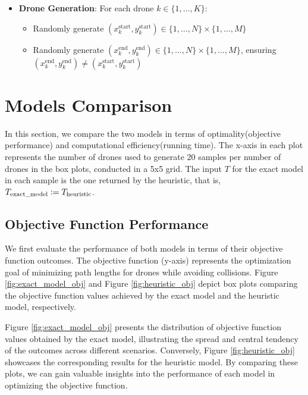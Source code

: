 \begin{itemize}
\item \textbf{Drone Generation}: For each drone $k \in \{1, \ldots, K\}$:
  \begin{itemize}
  \item Randomly generate $(x_k^{\text{start}}, y_k^{\text{start}}) \in \{1, \ldots, N\} \times \{1, \ldots, M\}$
  \item Randomly generate $(x_k^{\text{end}}, y_k^{\text{end}}) \in \{1, \ldots, N\} \times \{1, \ldots, M\}$, ensuring $(x_k^{\text{end}}, y_k^{\text{end}}) \neq (x_k^{\text{start}}, y_k^{\text{start}})$
  \end{itemize}
\end{itemize}

\section{Models Comparison}
\label{sec:comparison}

In this section, we compare the two models in terms of optimality(objective performance) and computational efficiency(running time). The x-axis in each plot represents the number of drones used to generate 20 samples per number of drones in the box plots, conducted in a 5x5 grid. The input $T$ for the exact model in each sample is the one returned by the heuristic, that is, $ T_{\text{exact\_model}} \vcentcolon  = T_{\text{heuristic}}$.

\subsection{Objective Function Performance}

We first evaluate the performance of both models in terms of their objective function outcomes. The objective function (y-axis) represents the optimization goal of minimizing path lengths for drones while avoiding collisions. Figure \ref{fig:exact_model_obj} and Figure \ref{fig:heuristic_obj} depict box plots comparing the objective function values achieved by the exact model and the heuristic model, respectively. 

Figure \ref{fig:exact_model_obj} presents the distribution of objective function values obtained by the exact model, illustrating the spread and central tendency of the outcomes across different scenarios. Conversely, Figure \ref{fig:heuristic_obj} showcases the corresponding results for the heuristic model. By comparing these plots, we can gain valuable insights into the performance of each model in optimizing the objective function.


